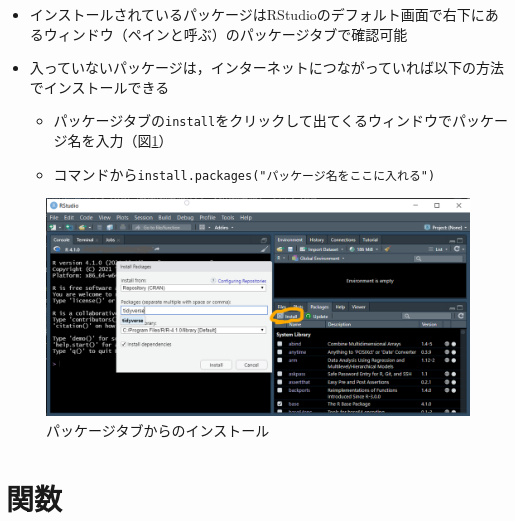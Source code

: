 \documentclass[
  xelatex,ja=standard, b5paper]{bxjsbook}
\providecommand{\tightlist}{%
  \setlength{\itemsep}{0pt}\setlength{\parskip}{0pt}}
\begin{document}
\begin{itemize}
\tightlist
\item
  インストールされているパッケージはRStudioのデフォルト画面で右下にあるウィンドウ（ペインと呼ぶ）のパッケージタブで確認可能\\
\item
  入っていないパッケージは，インターネットにつながっていれば以下の方法でインストールできる

  \begin{itemize}
  \tightlist
  \item
    パッケージタブの\texttt{install}をクリックして出てくるウィンドウでパッケージ名を入力（図\ref{fig:pinst}）
  \item
    コマンドから\texttt{install.packages("パッケージ名をここに入れる")}
  \end{itemize}
\end{itemize}

\begin{figure}

{\centering \includegraphics[width=0.8\linewidth]{images/package_install} 

}

\caption{パッケージタブからのインストール}\label{fig:pinst}
\end{figure}

\hypertarget{p-function}{%
\section{関数}\label{p-function}}
\end{document}
